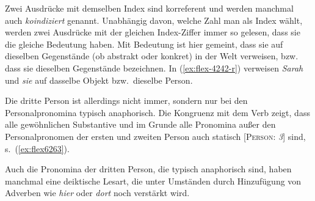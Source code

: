 \begin{exe}
\end{exe}

Zwei Ausdrücke mit demselben Index sind korreferent und werden manchmal auch \textit{koindiziert} genannt.
Unabhängig davon, welche Zahl man als Index wählt, werden zwei Ausdrücke mit der gleichen Index-Ziffer immer so gelesen, dass sie die gleiche Bedeutung haben.
Mit Bedeutung ist hier gemeint, dass sie auf dieselben Gegenstände (ob abstrakt oder konkret) in der Welt verweisen, bzw. dass sie dieselben Gegenstände bezeichnen.
In (\ref{ex:flex-4242-r}) verweisen \textit{Sarah} und \textit{sie} auf dasselbe Objekt bzw.\ dieselbe Person.

Die dritte Person ist allerdings nicht immer, sondern nur bei den Personalpronomina typisch anaphorisch.
Die Kongruenz mit dem Verb zeigt, dass alle gewöhnlichen Substantive und im Grunde alle Pronomina außer den Personalpronomen der ersten und zweiten Person auch statisch [\textsc{Person}: \textit{3}] sind, s.\ (\ref{ex:flex6263}).

\begin{exe}
  \ex \label{ex:flex6263}
  \begin{xlist}
  \end{xlist}
\end{exe}

Auch die Pronomina der dritten Person, die typisch anaphorisch sind, haben manchmal eine deiktische Lesart, die unter Umständen durch Hinzufügung von Adverben wie \textit{hier} oder \textit{dort} noch verstärkt wird.

\begin{exe}
\end{exe}

